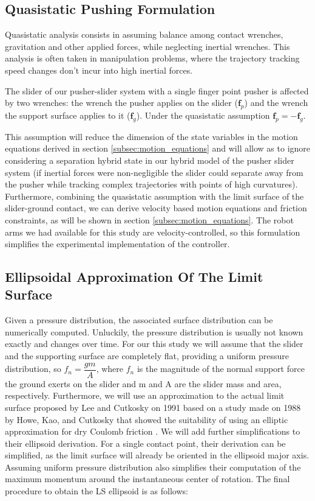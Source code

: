 \documentclass[12,twoside]{TFG-GM}
\theoremstyle{definition}
\theoremstyle{remark}
\begin{document}
\subsection{Quasistatic Pushing Formulation}
\label{subsec:quasistatic}
Quasistatic analysis consists in assuming balance among contact wrenches, gravitation and other applied forces, while neglecting inertial wrenches. This analysis is often taken in manipulation problems, where the trajectory tracking speed changes don't incur into high inertial forces.

The slider of our pusher-slider system with a single finger point pusher is affected by two wrenches: the wrench the pusher applies on the slider ($\textbf{f}_p$) and the wrench the support surface applies to it ($\textbf{f}_g$). Under the quasistatic assumption $\textbf{f}_p = -\textbf{f}_g$.

This assumption will reduce the dimension of the state variables in the motion equations derived in section \ref{subsec:motion_equations} and will allow as to ignore considering a separation hybrid state in our hybrid model of the pusher slider system (if inertial forces were non-negligible the slider could separate away from the pusher while tracking complex trajectories with points of high curvatures). Furthermore, combining the quasistatic assumption with the limit surface of the slider-ground contact, we can derive velocity based motion equations and friction constraints, as will be shown in section \ref{subsec:motion_equations}. The robot arms we had available for this study are velocity-controlled, so this formulation simplifies the experimental implementation of the controller.

\subsection{Ellipsoidal Approximation Of The Limit Surface}
Given a pressure distribution, the associated surface distribution can be numerically computed. Unluckily, the pressure distribution is usually not known exactly and changes over time. For our this study we will assume that the slider and the supporting surface are completely flat, providing a uniform pressure distribution, so $f_n = \dfrac{g m}{A}$, where $f_n$ is the magnitude of the normal support force the ground exerts on the slider and m and A are the slider mass and area, respectively. Furthermore, we will use an approximation to the actual limit surface proposed by Lee and Cutkosky on 1991 \cite{ellipsoidal_ls} based on a study made on 1988 by Howe, Kao, and Cutkosky that showed the suitability of using an elliptic approximation for dry Coulomb friction \cite{elliptical_approx}. We will add further simplifications to their ellipsoid derivation. For a single contact point, their derivation can be simplified, as the limit surface will already be oriented in the ellipsoid major axis. Assuming uniform pressure distribution also simplifies their computation of the maximum momentum around the instantaneous center of rotation. The final procedure to obtain the LS ellipsoid is as follows:
\end{document}
